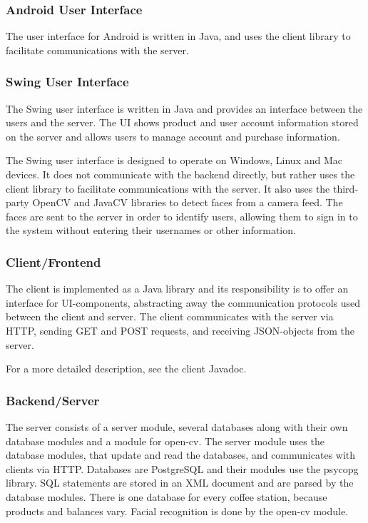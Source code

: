 \documentclass[11pt]{article}
\begin{document}
\subsubsection*{Android User Interface}

The user interface for Android is written in Java, and uses the client
library to facilitate communications with the server.

\subsubsection*{Swing User Interface}
     
The Swing user interface is written in Java and provides an interface
between the users and the server. The UI shows product and user account
information stored on the server and allows users to manage account
and purchase information.

The Swing user interface is designed to operate on Windows, Linux and
Mac devices. It does not communicate with the backend directly, but rather
uses the client library to facilitate communications with the server.
It also uses the third-party OpenCV and JavaCV libraries to detect faces
from a camera feed. The faces are sent to the server in order to identify
users, allowing them to sign in to the system without entering their
usernames or other information.

\subsubsection*{Client/Frontend}
The client is implemented as a Java library and its responsibility is
to offer an interface for UI-components, abstracting away the
communication protocols used between the client and server. The client 
communicates with the server via HTTP, sending GET and POST requests, 
and receiving JSON-objects from the server. 

For a more detailed description, see the client Javadoc.

\subsubsection*{Backend/Server}
The server consists of a server module, several databases along with their own database modules and a module for open-cv. 
The server module uses the database modules, that update and read the databases, and communicates with clients via HTTP.
Databases are PostgreSQL and their modules use the psycopg library. SQL statements are stored in an XML document and are
parsed by the database modules. There is one database for every coffee station, because
products and balances vary. Facial recognition is done by the open-cv module. 
\end{document}
